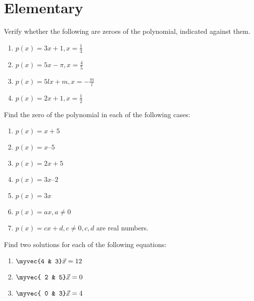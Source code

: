 
\section{Elementary}
 \item Verify whether the following are zeroes of the polynomial, indicated against them. 
\begin{enumerate}
\item $ p(x) = 3x + 1, x = \frac{1}{3}$
\item $ p(x) = 5x -\pi, x = \frac{4}{5}$
\item $ p(x) = 5lx+m, x = -\frac{m}{l}$
\item $ p(x) = 2x+1, x = \frac{1}{2}$
\end{enumerate}
%
\solution 

%
\item Find the zero of the polynomial in each of the following cases: 
\begin{enumerate}
\item $p(x) = x + 5 $
\item $p(x) = x – 5$
\item $p(x) = 2x + 5$
\item $p(x) = 3x – 2$
 \item $p(x) = 3x$
 \item $p(x) = ax, a \ne 0$
\item $p(x) = cx + d, c \ne 0, c, d$ are real numbers.
\end{enumerate}
\solution 

\item Find two solutions for each of the following equations: 
\begin{enumerate}
\item $\myvec{4 & 3}\vec{x} = 12$
\item $\myvec{ 2 & 5}\vec{x}  = 0 $
\item $\myvec{ 0 & 3}\vec{x}  = 4$
\end{enumerate}
\solution 


